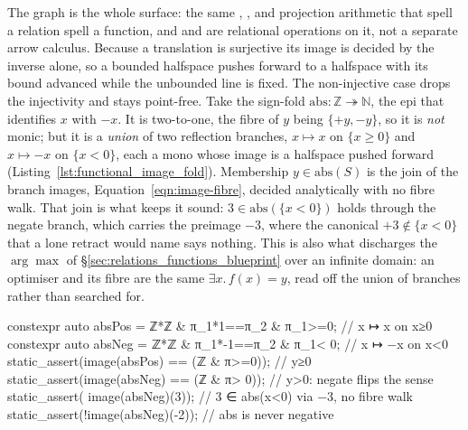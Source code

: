 \documentclass[11pt, a4paper]{article}
\begin{document}
The graph is the whole surface: the same \cppinline{*}, \cppinline{|}, and projection arithmetic that spell a relation spell a function, and  and  are relational operations on it, not a separate arrow calculus.
Because a translation is surjective its image is decided by the inverse alone, so a bounded halfspace pushes forward to a halfspace with its bound advanced while the unbounded line is fixed.
The non-injective case drops the injectivity and stays point-free.
Take the sign-fold $\mathrm{abs}\colon \mathbb{Z} \twoheadrightarrow \mathbb{N}$, the epi that identifies $x$ with $-x$.
It is two-to-one, the fibre of $y$ being $\{{+}y, {-}y\}$, so it is \emph{not} monic; but it is a \emph{union} of two reflection branches, $x\mapsto x$ on $\{x\ge 0\}$ and $x\mapsto -x$ on $\{x<0\}$, each a mono whose image is a halfspace pushed forward (Listing~\ref{lst:functional_image_fold}).
Membership $y \in \mathrm{abs}(S)$ is the join of the branch images, Equation~\ref{eqn:image-fibre}, decided analytically with no fibre walk.
That join is what keeps it sound: $3 \in \mathrm{abs}(\{x<0\})$ holds through the negate branch, which carries the preimage ${-}3$, where the canonical ${+}3 \notin \{x<0\}$ that a lone retract would name says nothing.
This is also what discharges the $\arg\max$ of §\ref{sec:relations_functions_blueprint} over an infinite domain: an optimiser and its fibre are the same $\exists x.\,f(x){=}y$, read off the union of branches rather than searched for.

\begin{listing}[htbp]
\caption{The sign-fold epi $\mathrm{abs}\colon \mathbb{Z}\twoheadrightarrow\mathbb{N}$ decided \emph{point-free}: a union of two reflection branches ($x\mapsto x$ on $\{x\ge0\}$, $x\mapsto -x$ on $\{x<0\}$), each a mono whose  is a halfspace pushed forward (the negate branch flips $\le$ to $>$).
Non-injective yet analytic: $3 \in \mathrm{abs}(\{x<0\})$ holds through the negate branch's preimage $-3$, where the canonical $+3 \notin \{x<0\}$ that a lone retract names says nothing: soundness from the fibre join, no enumeration (checked-in witnesses).}
\label{lst:functional_image_fold}
\begin{cpp}
constexpr auto absPos = ℤ*ℤ & π_1*1==π_2  & π_1>=0;  // x ↦  x  on x≥0
constexpr auto absNeg = ℤ*ℤ & π_1*-1==π_2 & π_1< 0;  // x ↦ −x  on x<0
static_assert(image(absPos) == (ℤ & π>=0));  // {y≥0}
static_assert(image(absNeg) == (ℤ & π> 0));  // {y>0}: negate flips the sense
static_assert( image(absNeg)(3));   // 3 ∈ abs({x<0}) via −3, no fibre walk
static_assert(!image(absNeg)(-2));  // abs is never negative
\end{cpp}
\end{listing}
\end{document}
